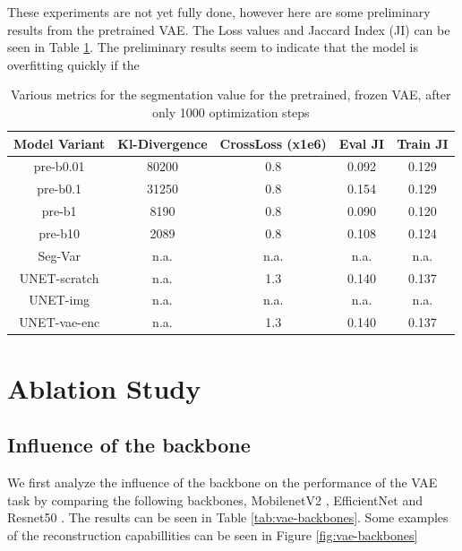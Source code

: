 These experiments are not yet fully done, however here are some preliminary results from the pretrained VAE. The Loss values and Jaccard Index (JI) can be seen in Table \ref{tab:seg-vae}. The preliminary results seem to indicate that the model is overfitting quickly if the 

\begin{table}[!ht]
    \centering
    \caption{Various metrics for the segmentation value for the pretrained, frozen VAE, after only 1000 optimization steps}
    \label{tab:seg-vae}
    \begin{tabular}{ccccc}
        \hline
        Model Variant & Kl-Divergence & CrossLoss (x1e6) & Eval JI & Train JI \\
        \hline
        pre-b0.01     & 80200         & 0.8              & 0.092   & 0.129    \\
        pre-b0.1      & 31250         & 0.8              & 0.154   & 0.129    \\
        pre-b1        & 8190          & 0.8              & 0.090   & 0.120    \\
        pre-b10       & 2089          & 0.8              & 0.108   & 0.124    \\
        Seg-Var       & n.a.          & n.a.             & n.a.    & n.a.     \\
        UNET-scratch  & n.a.          & 1.3              & 0.140   & 0.137    \\
        UNET-img      & n.a.          & n.a.             & n.a.    & n.a.     \\
        UNET-vae-enc  & n.a.          & 1.3              & 0.140   & 0.137    \\
        \hline
    \end{tabular}
\end{table}


\section{Ablation Study}
\subsection{Influence of the backbone}
We first analyze the influence of the backbone on the performance of the VAE task by comparing the following backbones, MobilenetV2 \cite{sandler2019mobilenetv2invertedresidualslinear}, EfficientNet \cite{tan2020efficientnetrethinkingmodelscaling} and Resnet50 \cite{he2015deep}. The results can be seen in Table \ref{tab:vae-backbones}. Some examples of the reconstruction capabillities can be seen in Figure \ref{fig:vae-backbones}

